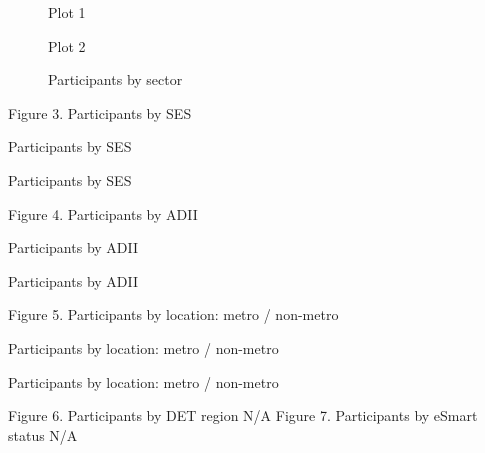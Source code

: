 \documentclass[
  letterpaper,
  DIV=11,
  numbers=noendperiod]{scrartcl}
\begin{document}
\begin{figure}

\begin{minipage}[t]{0.50\linewidth}

{\centering 

}

\end{minipage}%
%
\begin{minipage}[t]{0.50\linewidth}

{\centering 

Plot 1

}

\end{minipage}%
\newline
\begin{minipage}[t]{0.50\linewidth}

{\centering 

}

\end{minipage}%
%
\begin{minipage}[t]{0.50\linewidth}

{\centering 

Plot 2

}

\end{minipage}%
\newline
\begin{minipage}[t]{0.50\linewidth}

{\centering 

Participants by sector

}

\end{minipage}%

\end{figure}

Figure 3. Participants by SES

Participants by SES

Participants by SES

Figure 4. Participants by ADII

Participants by ADII

Participants by ADII

Figure 5. Participants by location: metro / non-metro

Participants by location: metro / non-metro

Participants by location: metro / non-metro

Figure 6. Participants by DET region N/A Figure 7. Participants by
eSmart status N/A
\end{document}
